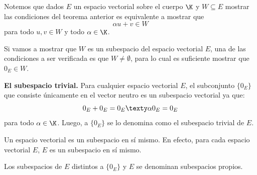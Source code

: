 \documentclass[compacto,10pt]{pubciencias-notas}
\begin{document}
\begin{obs}
Notemos que dados $E$ un espacio vectorial sobre el cuerpo $\K$ y $W\subseteq E$ mostrar las condiciones del teorema anterior es equivalente a mostrar que 
\[
    \alpha u + v \in W 
\]
para todo $u, v \in W$ y todo $\alpha\in\K$.
\end{obs}


\begin{advertencia}
Si vamos a mostrar que $W$ es un subespacio del espacio vectorial $E$, una de las condiciones a ser verificada es que $W\neq\emptyset$, para lo cual es suficiente mostrar que $0_{E}\in W$.
\end{advertencia}

\begin{ejem}\hspace{0pt} \textbf{El subespacio trivial.} Para cualquier espacio vectorial $E$, el subconjunto $\{0_{E}\}$
que consiste únicamente en el vector neutro es un subespacio vectorial ya que:
\[
   0_{E} + 0_{E}=0_{E}
   \texty
   \alpha 0_{E}=0_{E}
\]
para todo $\alpha\in\K$. Luego, a $\{0_{E}\}$ se lo denomina como el subespacio trivial de $E$.
\end{ejem}

\begin{ejem}\hspace{0pt} Un espacio vectorial es un subespacio en sí mismo. En efecto, para cada espacio vectorial $E$, $E$ es un subespacio en sí mismo.
\end{ejem}

\begin{obs}
Los subespacios de $E$ distintos a $\{0_{E}\}$ y $E$ se denominan subespacios propios. 
\end{obs}
\end{document}

